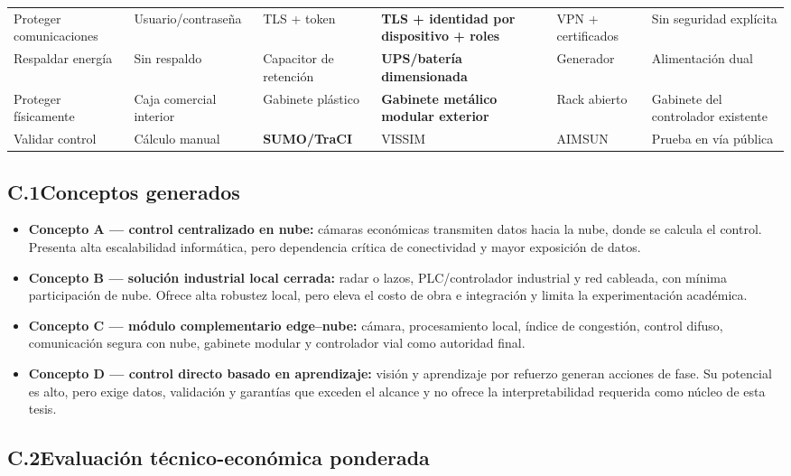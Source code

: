 \begin{landscape}
\begin{longtable}{@{}p{3.8cm}p{3.8cm}p{3.8cm}p{3.8cm}p{3.8cm}p{3.8cm}@{}}
Proteger comunicaciones & Usuario/contraseña & TLS + token & \textbf{TLS + identidad por dispositivo + roles} & VPN + certificados & Sin seguridad explícita\\
Respaldar energía & Sin respaldo & Capacitor de retención & \textbf{UPS/batería dimensionada} & Generador & Alimentación dual\\
Proteger físicamente & Caja comercial interior & Gabinete plástico & \textbf{Gabinete metálico modular exterior} & Rack abierto & Gabinete del controlador existente\\
Validar control & Cálculo manual & \textbf{SUMO/TraCI} & VISSIM & AIMSUN & Prueba en vía pública\\
\end{longtable}
\end{landscape}

\subsection*{C.1\quad Conceptos generados}

\begin{itemize}
  \item \textbf{Concepto A --- control centralizado en nube:} cámaras económicas transmiten datos hacia la
  nube, donde se calcula el control. Presenta alta escalabilidad informática, pero dependencia crítica de
  conectividad y mayor exposición de datos.
  \item \textbf{Concepto B --- solución industrial local cerrada:} radar o lazos, PLC/controlador industrial y
  red cableada, con mínima participación de nube. Ofrece alta robustez local, pero eleva el costo de obra e
  integración y limita la experimentación académica.
  \item \textbf{Concepto C --- módulo complementario edge--nube:} cámara, procesamiento local, índice de
  congestión, control difuso, comunicación segura con nube, gabinete modular y controlador vial como autoridad
  final.
  \item \textbf{Concepto D --- control directo basado en aprendizaje:} visión y aprendizaje por refuerzo
  generan acciones de fase. Su potencial es alto, pero exige datos, validación y garantías que exceden el
  alcance y no ofrece la interpretabilidad requerida como núcleo de esta tesis.
\end{itemize}

\subsection*{C.2\quad Evaluación técnico-económica ponderada}

